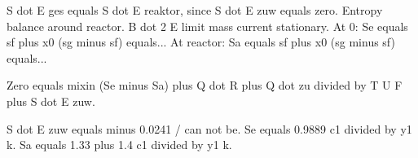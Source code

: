 S dot E ges equals S dot E reaktor, since S dot E zuw equals zero.  
Entropy balance around reactor.  
B dot 2 E limit mass current stationary.  
At 0: Se equals sf plus x0 (sg minus sf) equals...  
At reactor:  
Sa equals sf plus x0 (sg minus sf) equals...  

Zero equals mixin (Se minus Sa) plus Q dot R plus Q dot zu divided by T U F plus S dot E zuw.  

S dot E zuw equals minus 0.0241 / can not be.  
Se equals 0.9889 c1 divided by y1 k.  
Sa equals 1.33 plus 1.4 c1 divided by y1 k.